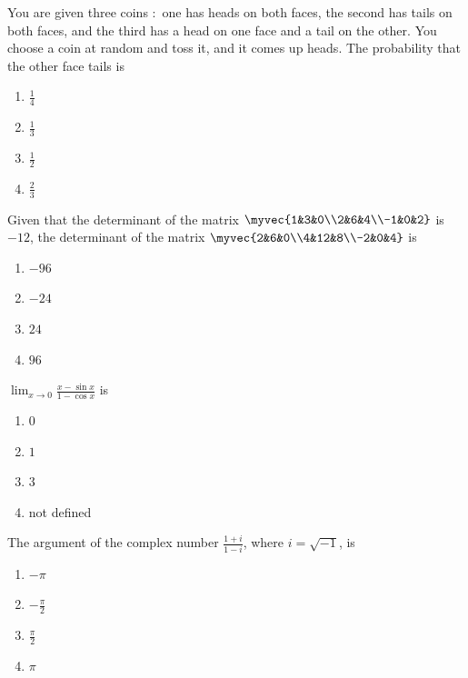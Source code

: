     
    \item You are given three coins $\colon$ one has heads on both faces, the second has tails on both faces, and the third has a head on one face and a tail on the other. You choose a coin at random and toss it, and it comes up heads. The probability that the other face tails is
    \begin{enumerate}
        \item $\frac{1}{4}$
        \item $\frac{1}{3}$
        \item $\frac{1}{2}$
        \item $\frac{2}{3}$
    \end{enumerate}
    \item Given that the determinant of the matrix $\myvec{1&3&0\\2&6&4\\-1&0&2}$ is $-12$, the determinant of the matrix $\myvec{2&6&0\\4&12&8\\-2&0&4}$ is
    \begin{enumerate}
        \item $-96$
        \item $-24$
        \item $24$
        \item $96$
    \end{enumerate}
    \item $\lim_{x\to0}\frac{x-\sin x}{1-\cos{x}}$ is
        \begin{enumerate}
            \item $0$
            \item $1$
            \item $3$
            \item not defined
        \end{enumerate}
    \item The argument of the complex number $\frac{1+i}{1-i}$, where $i=\sqrt{-1}$, is
            \begin{enumerate}
                \item $-\pi$
                \item $-\frac{\pi}{2}$
                \item $\frac{\pi}{2}$
                \item $\pi$
            \end{enumerate}
